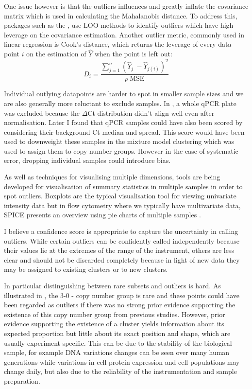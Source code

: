 One issue however is that the outliers influences and greatly inflate the covariance matrix which is used in calculating the Mahalanobis distance.
To address this, packages such as the , use \gls{LOO} methods to identify outliers which have high leverage on the covariance estimation.
Another outlier metric, commonly used in linear regression is Cook's distance, which returns the leverage of every data point $i$  on the estimation of $\hat Y$ when the point is left out:
\[
D_i = \frac{ \sum_{j=1}^n (\hat Y_j\ - \hat Y_{j(i)})^2 }{p \ \mathrm{MSE}}
\]

Individual outlying datapoints are harder to spot in smaller sample sizes and we are also generally more reluctant to exclude samples.
In , a whole qPCR plate was excluded because the $\Delta$Ct distribution didn’t align well even after normalisation.
Later I found that qPCR samples could have also been scored by considering their background Ct median and spread.
This score would have been used to downweight these samples in the mixture model clustering which was used to assign them to copy number groups.  
However in the case of systematic error, dropping individual samples could introduce bias.

As well as techniques for visualising multiple dimensions, tools are being developed for visualisation of summary statistics in multiple samples in order to spot outliers.
Boxplots are the typical visualisation tool for viewing univariate intensity data but in flow cytometry where we typically have multivariate data,
\gls{SPICE} presents an overview using pie charts of multiple samples \citep{Roederer:2011hy}.

I believe a confidence score is appropriate to capture the uncertainty in calling outliers.
While certain outliers can be confidently called independently because their values lie at the extremes of the range of the instrument, others are less clear and should not be discarded completely because in light of new data they may be assigned to existing clusters or to new clusters.

In particular distinguishing between rare subsets and outliers is hard.
As illustrated in , the 3-0 - copy number group is rare and these points could have been regarded as outliers if there was no strong prior evidence supporting the existence of this copy number group from previous studies.
However, prior evidence supporting the existence of a cluster yields information about its expected proportion but little about its exact position and shape, which are usually experiment specific.
This can be due to the stability of the biological sample,  for example DNA variations changes can be seen over many human generations while variations in cell protein expression and cell populations may change daily, but also due to the reliability of the instrumentation and sample preparation.

